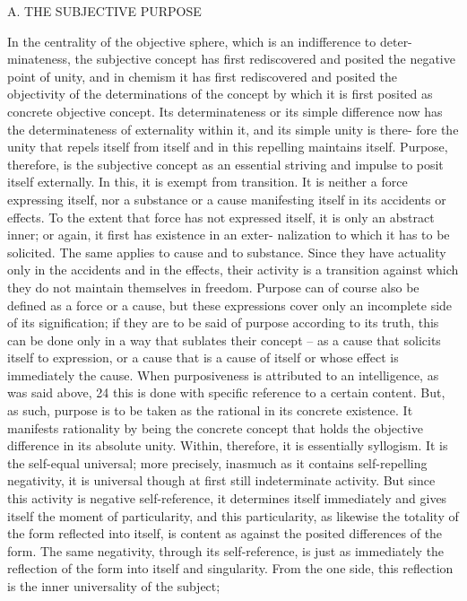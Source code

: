 
A. THE SUBJECTIVE PURPOSE

In the centrality of the objective sphere, which is an indifference to deter-
minateness, the subjective concept has first rediscovered and posited the
negative point of unity, and in chemism it has first rediscovered and posited
the objectivity of the determinations of the concept by which it is first posited
as concrete objective concept. Its determinateness or its simple difference now
has the determinateness of externality within it, and its simple unity is there-
fore the unity that repels itself from itself and in this repelling maintains
itself. Purpose, therefore, is the subjective concept as an essential striving
and impulse to posit itself externally. In this, it is exempt from transition.
It is neither a force expressing itself, nor a substance or a cause manifesting
itself in its accidents or effects. To the extent that force has not expressed
itself, it is only an abstract inner; or again, it first has existence in an exter-
nalization to which it has to be solicited. The same applies to cause and to
substance. Since they have actuality only in the accidents and in the effects,
their activity is a transition against which they do not maintain themselves
in freedom. Purpose can of course also be defined as a force or a cause, but
these expressions cover only an incomplete side of its signification; if they
are to be said of purpose according to its truth, this can be done only in a
way that sublates their concept – as a cause that solicits itself to expression,
or a cause that is a cause of itself or whose effect is immediately the cause.
When purposiveness is attributed to an intelligence, as was said above, 24
this is done with specific reference to a certain content. But, as such,
purpose is to be taken as the rational in its concrete existence. It manifests
rationality by being the concrete concept that holds the objective difference
in its absolute unity. Within, therefore, it is essentially syllogism. It is the
self-equal universal; more precisely, inasmuch as it contains self-repelling
negativity, it is universal though at first still indeterminate activity. But since
this activity is negative self-reference, it determines itself immediately and
gives itself the moment of particularity, and this particularity, as likewise
the totality of the form reflected into itself, is content as against the posited
differences of the form. The same negativity, through its self-reference, is
just as immediately the reflection of the form into itself and singularity.
From the one side, this reflection is the inner universality of the subject;

